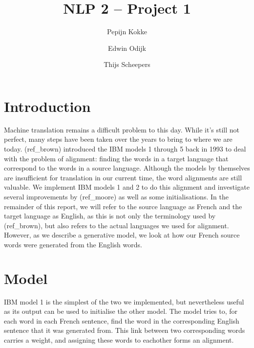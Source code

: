 \documentclass[11pt]{article}
\title{NLP 2 -- Project 1}
\author{Pepijn Kokke \and Edwin Odijk \and Thijs Scheepers}
\date{}
\begin{document}
\maketitle

\begin{abstract}
\end{abstract}

\section{Introduction}
Machine translation remains a difficult problem to this day. While it's still not perfect, many steps have been taken over the years to bring to where we are today. (ref\_brown) introduced the IBM models 1 through 5 back in 1993 to deal with the problem of alignment: finding the words in a target language that correspond to the words in a source language. Although the models by themselves are insufficient for translation in our current time, the word alignments are still valuable. We implement IBM models 1 and 2 to do this alignment and investigate several improvements by (ref\_moore) as well as some initialisations. In the remainder of this report, we will refer to the source language as French and the target language as English, as this is not only the terminology used by (ref\_brown), but also refers to the actual languages we used for alignment. However, as we describe a generative model, we look at how our French source words were generated from the English words. %

\section{Model}
IBM model 1 is the simplest of the two we implemented, but nevertheless useful as its output can be used to initialise the other model. The model tries to, for each word in each French sentence, find the word in the corresponding English sentence that it was generated from. This link between two corresponding words carries a weight, and assigning these words to eachother forms an alignment.
\end{document}
